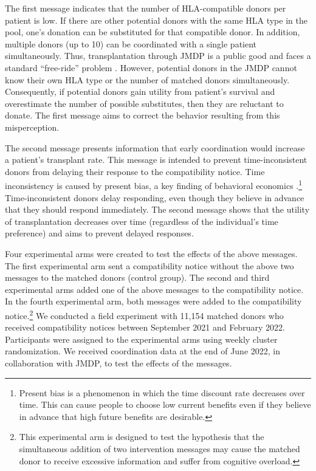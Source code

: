 \documentclass[12pt, a4paper]{article}
\begin{document}
The first message indicates that the number of HLA-compatible donors per patient is low. If there are other potential donors with the same HLA type in the pool, one's donation can be substituted for that compatible donor. In addition, multiple donors (up to 10) can be coordinated with a single patient simultaneously. Thus, transplantation through JMDP is a public good and faces a standard ``free-ride'' problem \citep{Bergstrom2009}. However, potential donors in the JMDP cannot know their own HLA type or the number of matched donors simultaneously. Consequently, if potential donors gain utility from patient's survival and overestimate the number of possible substitutes, then they are reluctant to donate. The first message aims to correct the behavior resulting from this misperception.

The second message presents information that early coordination would increase a patient's transplant rate. This message is intended to prevent time-inconsistent donors from delaying their response to the compatibility notice. Time inconsistency is caused by present bias, a key finding of behavioral economics \citep{Laibson1997, ODonoghue2001}.\footnote{Present bias is a phenomenon in which the time discount rate decreases over time. This can cause people to choose low current benefits even if they believe in advance that high future benefits are desirable.} Time-inconsistent donors delay responding, even though they believe in advance that they should respond immediately. The second message shows that the utility of transplantation decreases over time (regardless of the individual's time preference) and aims to prevent delayed responses.

Four experimental arms were created to test the effects of the above messages. The first experimental arm sent a compatibility notice without the above two messages to the matched donors (control group). The second and third experimental arms added one of the above messages to the compatibility notice. In the fourth experimental arm, both messages were added to the compatibility notice.\footnote{This experimental arm is designed to test the hypothesis that the simultaneous addition of two intervention messages may cause the matched donor to receive excessive information and suffer from cognitive overload.} We conducted a field experiment with 11,154 matched donors who received compatibility notices between September 2021 and February 2022. Participants were assigned to the experimental arms using weekly cluster randomization. We received coordination data at the end of June 2022, in collaboration with JMDP, to test the effects of the messages.
\end{document}
